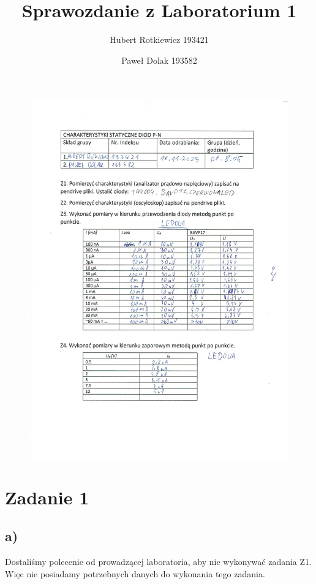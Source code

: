 \documentclass{article}
\title{Sprawozdanie z Laboratorium 1}
\author{
  Hubert Rotkiewicz 193421 \and 
  Paweł Dolak 193582
}
\begin{document}
\maketitle
\begin{figure}[h]
  \includegraphics[scale=0.6]{./img/Protokol_pp_cw1.jpg}
\end{figure}
\clearpage
\raggedright
\section{Zadanie 1}
\subsection{a)}
\centering
Dostaliśmy polecenie od prowadzącej laboratoria, aby nie wykonywać zadania Z1. Więc nie posiadamy potrzebnych danych do wykonania tego zadania.
\raggedright
\end{document}
